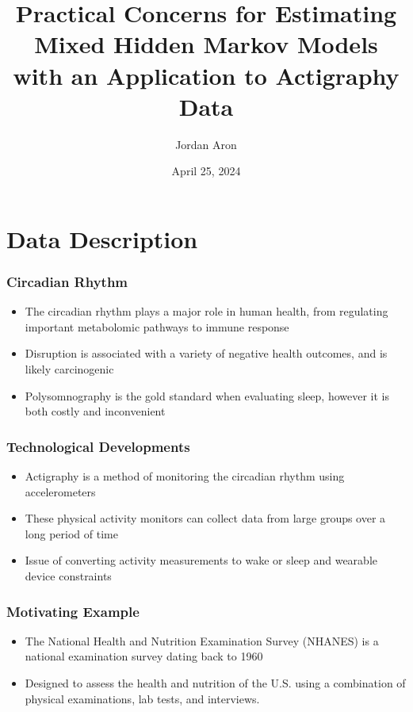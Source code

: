 \documentclass{beamer}
\title[]{Practical Concerns for Estimating Mixed Hidden Markov Models with an Application to Actigraphy Data} %
\author{Jordan Aron} %
\institute[] %
{
\\ %
}
\date{April 25, 2024} %
\begin{document}
\begin{frame}
\titlepage %
\end{frame}





\section{Data Description} 
\begin{frame}
\frametitle{Circadian Rhythm}
\begin{itemize}
    \item The circadian rhythm plays a major role in human health, from regulating important metabolomic pathways to immune response
    \item Disruption is associated with a variety of negative health outcomes, and is likely carcinogenic
    \item Polysomnography is the gold standard when evaluating sleep, however it is both costly and inconvenient

\end{itemize}

\end{frame}
\begin{frame}
\frametitle{Technological Developments}
\begin{itemize}
    \item Actigraphy is a method of monitoring the circadian rhythm using accelerometers
    \item These physical activity monitors can collect data from large groups over a long period of time
    \item Issue of converting activity measurements to wake or sleep and wearable device constraints

\end{itemize}

\end{frame}
\begin{frame}
\frametitle{Motivating Example}
\begin{itemize}
    \item The National Health and Nutrition Examination Survey (NHANES) is a national examination survey dating back to 1960
    \item Designed to assess the health and nutrition of the U.S. using a combination of physical examinations, lab tests, and interviews.

\end{itemize}

\end{frame}
\end{document}
